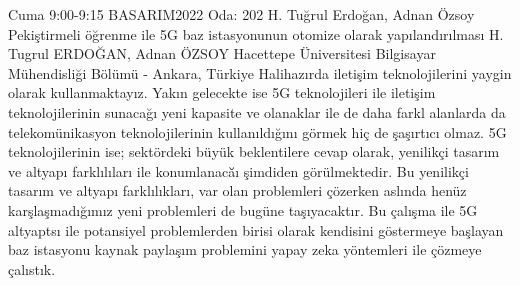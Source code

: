 
    \begin{abstract_basarim}
    {Cuma 9:00-9:15}
    {BASARIM2022}
    {Oda: 202}
    {H. Tuğrul Erdoğan, Adnan Özsoy}
    {Pekiştirmeli öğrenme ile 5G baz istasyonunun otomize olarak yapılandırılması}
    {%
    H. Tugrul ERDOĞAN, Adnan ÖZSOY}
    {%
    }
    {%
    Hacettepe Üniversitesi Bilgisayar Mühendisliği Bölümü - Ankara, Türkiye}
    Halihazırda iletişim teknolojilerini yaygin olarak kullanmaktayız. Yakın gelecekte ise 5G teknolojileri ile iletişim teknolojilerinin sunacağı yeni kapasite ve olanaklar ile de daha farkl alanlarda da telekomünikasyon teknolojilerinin kullanıldığını görmek hiç de şaşırtıcı olmaz. 5G teknolojilerinin ise; sektördeki büyük beklentilere cevap olarak, yenilikçi tasarım ve altyapı farklılıları ile konumlanacă̆ı şimdiden görülmektedir. Bu yenilikçi tasarım ve altyapı farklılıkları, var olan problemleri çözerken aslında henüz karşlaşmadığımız yeni problemleri de bugüne taşıyacaktır. Bu çalışma ile 5G altyaptsı ile potansiyel problemlerden birisi olarak kendisini göstermeye başlayan baz istasyonu kaynak paylaşım problemini yapay zeka yöntemleri ile çözmeye çalıstık. 
    
    \end{abstract_basarim}
    